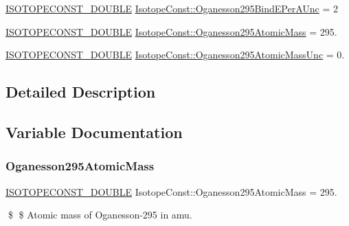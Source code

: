 \begin{DoxyCompactItemize}
\mbox{\hyperlink{group___isotope_const-_macros_ga8f45a7272ce02c0b4c65c44636ed719a}{I\+S\+O\+T\+O\+P\+E\+C\+O\+N\+S\+T\+\_\+\+D\+O\+U\+B\+LE}} \mbox{\hyperlink{group___isotope_const-_oganesson-_og295_ga00faa0ed27f1e090f764cd8404b027d3}{Isotope\+Const\+::\+Oganesson295\+Bind\+E\+Per\+A\+Unc}} = 2
\item 
\mbox{\hyperlink{group___isotope_const-_macros_ga8f45a7272ce02c0b4c65c44636ed719a}{I\+S\+O\+T\+O\+P\+E\+C\+O\+N\+S\+T\+\_\+\+D\+O\+U\+B\+LE}} \mbox{\hyperlink{group___isotope_const-_oganesson-_og295_ga4ee567c4d00094ddc879009b42eb782c}{Isotope\+Const\+::\+Oganesson295\+Atomic\+Mass}} = 295.
\item 
\mbox{\hyperlink{group___isotope_const-_macros_ga8f45a7272ce02c0b4c65c44636ed719a}{I\+S\+O\+T\+O\+P\+E\+C\+O\+N\+S\+T\+\_\+\+D\+O\+U\+B\+LE}} \mbox{\hyperlink{group___isotope_const-_oganesson-_og295_ga1061fc13c1c6ac6a11078d4d236be73e}{Isotope\+Const\+::\+Oganesson295\+Atomic\+Mass\+Unc}} = 0.
\end{DoxyCompactItemize}


\subsection{Detailed Description}


\subsection{Variable Documentation}
\mbox{\label{group___isotope_const-_oganesson-_og295_ga4ee567c4d00094ddc879009b42eb782c}} 
\subsubsection{\texorpdfstring{Oganesson295\+Atomic\+Mass}{Oganesson295AtomicMass}}
{\footnotesize\ttfamily \mbox{\hyperlink{group___isotope_const-_macros_ga8f45a7272ce02c0b4c65c44636ed719a}{I\+S\+O\+T\+O\+P\+E\+C\+O\+N\+S\+T\+\_\+\+D\+O\+U\+B\+LE}} Isotope\+Const\+::\+Oganesson295\+Atomic\+Mass = 295.}

\$ \$ Atomic mass of Oganesson-\/295 in amu. \mbox{\label{group___isotope_const-_oganesson-_og295_ga1061fc13c1c6ac6a11078d4d236be73e}} 
